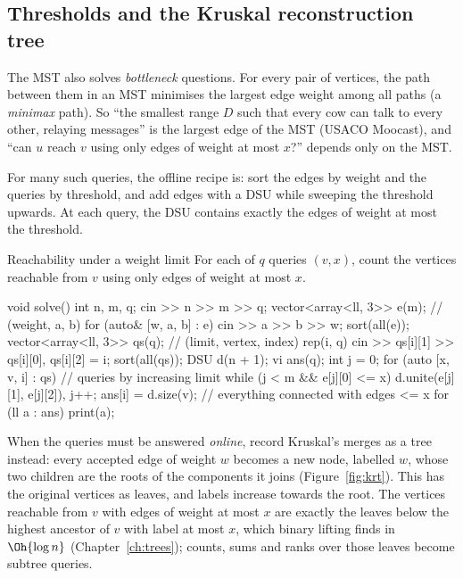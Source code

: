 
\subsection{Thresholds and the Kruskal reconstruction tree}

The MST also solves \emph{bottleneck} questions. For every pair of vertices, the path between them in an MST minimises the
largest edge weight among all paths (a \emph{minimax} path). So ``the smallest range $D$ such that every cow can talk to every
other, relaying messages'' is the largest edge of the MST (USACO Moocast), and ``can $u$ reach $v$ using only edges of weight at
most $x$?'' depends only on the MST.

For many such queries, the offline recipe is: sort the edges by weight and the queries by threshold, and add edges with a DSU
while sweeping the threshold upwards. At each query, the DSU contains exactly the edges of weight at most the threshold.

\begin{problem}{Reachability under a weight limit}
For each of $q$ queries $(v, x)$, count the vertices reachable from $v$ using only edges of weight at most $x$.
\end{problem}

\begin{code}
void solve() {
    int n, m, q;
    cin >> n >> m >> q;
    vector<array<ll, 3>> e(m);  // (weight, a, b)
    for (auto& [w, a, b] : e) cin >> a >> b >> w;
    sort(all(e));
    vector<array<ll, 3>> qs(q);  // (limit, vertex, index)
    rep(i, q) cin >> qs[i][1] >> qs[i][0], qs[i][2] = i;
    sort(all(qs));
    DSU d(n + 1);
    vi ans(q);
    int j = 0;
    for (auto [x, v, i] : qs) {  // queries by increasing limit
        while (j < m && e[j][0] <= x) d.unite(e[j][1], e[j][2]), j++;
        ans[i] = d.size(v);  // everything connected with edges <= x
    }
    for (ll a : ans) print(a);
}
\end{code}

When the queries must be answered \emph{online}, record Kruskal's merges as a tree instead: every accepted edge of weight $w$
becomes a new node, labelled $w$, whose two children are the roots of the components it joins (Figure~\ref{fig:krt}). This
 has the original vertices as leaves, and labels increase towards the root. The vertices
reachable from $v$ with edges of weight at most $x$ are exactly the leaves below the highest ancestor of $v$ with label at most
$x$, which binary lifting finds in $\Oh{\log n}$ (Chapter~\ref{ch:trees}); counts, sums and ranks over those leaves become
subtree queries.

